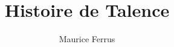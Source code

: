 \documentclass[a4paper,11pt]{book}
\begin{document}
\title{Histoire de Talence}
\author{Maurice Ferrus}
\frontmatter
\maketitle

\mainmatter{}
\tableofcontents{}






\end{document}
